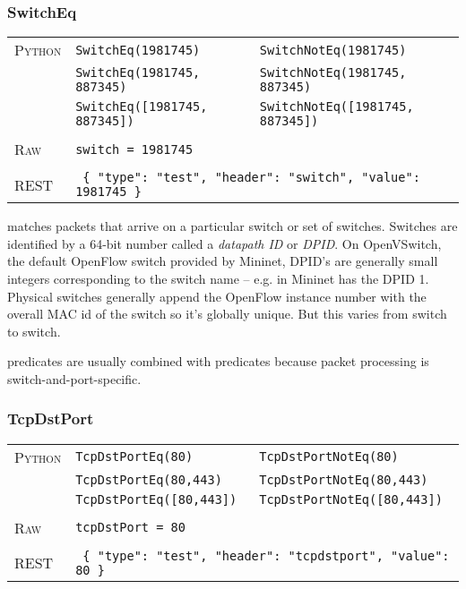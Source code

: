 \subsubsection{SwitchEq}

\bigskip
\begin{tabularx}{\linewidth}{lXX}
\textsc{Python} 	& \texttt{SwitchEq(1981745)} 		& \texttt{SwitchNotEq(1981745)} \\
	 	& \texttt{SwitchEq(1981745, 887345)} 	& \texttt{SwitchNotEq(1981745, 887345)} \\
	 	& \texttt{SwitchEq([1981745, 887345])} 	& \texttt{SwitchNotEq([1981745, 887345])} \\ \\
\textsc{Raw}		& \texttt{switch = 1981745} 		& \\ \\
\textsc{REST}	& \multicolumn{2}{l}{\texttt{ \{ "type": "test", "header": "switch", "value": 1981745 \} }} 
\end{tabularx}

 matches packets that arrive on a particular switch or set of switches.  
Switches are identified by 
a 64-bit number called a \emph{datapath ID} or \emph{DPID}.  On OpenVSwitch, the default OpenFlow
switch provided by Mininet, DPID's are generally small integers corresponding to the switch name --
e.g.  in Mininet has the DPID 1.  Physical switches generally append the OpenFlow instance
number with the overall MAC id of the switch so it's globally unique.  But this varies from switch
to switch. 

 predicates are usually combined with  predicates because packet processing
is switch-and-port-specific.  

\subsubsection{TcpDstPort}

\bigskip
\begin{tabularx}{\linewidth}{lXX}
\textsc{Python}   & \texttt{TcpDstPortEq(80)}    & \texttt{TcpDstPortNotEq(80)} \\
    & \texttt{TcpDstPortEq(80,443)}  & \texttt{TcpDstPortNotEq(80,443)} \\
    & \texttt{TcpDstPortEq([80,443])}  & \texttt{TcpDstPortNotEq([80,443])} \\ \\
\textsc{Raw}    & \texttt{tcpDstPort = 80}     & \\ \\
\textsc{REST} & \multicolumn{2}{l}{\texttt{ \{ "type": "test", "header": "tcpdstport", "value": 80 \} }} 
\end{tabularx}

